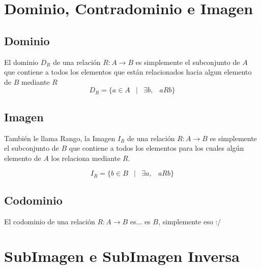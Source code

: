 \documentclass[12pt, fleqn]{report}                             %
\DeclareMathOperator \Space {\quad}                             %
\DeclareMathOperator \MiniSpace {\;}                            %
\newcommand \Such {\MiniSpace|\MiniSpace}                       %
\begin{document}
        \clearpage
        \section{Dominio, Contradominio e Imagen}
                
            \subsection*{Dominio}

                El dominio $D_R$ de una relación $R : A \to B$ es simplemente el subconjunto de $A$ que
                contiene a todos los elementos que están relacionados hacia algun elemento de $B$ mediante $R$
                \begin{equation}
                    D_R = \{ a \in A \Such \exists b, \MiniSpace aRb \}
                \end{equation}

            \subsection*{Imagen}

                También le llama Rango, la Imagen $I_R$ de una relación $R : A \to B$
                es simplemente el subconjunto de $B$ que contiene a todos los elementos
                para los cuales algún elemento de $A$ los relaciona mediante $R$.

                \begin{equation}
                    I_R = \{ b \in B \Such \exists a, \MiniSpace aRb \}
                \end{equation}

            \subsection*{Codominio}

                El codominio de una relación $R: A \to B$ es... es $B$, simplemente eso :/


        \clearpage
        \section{SubImagen e SubImagen Inversa}
\end{document}
